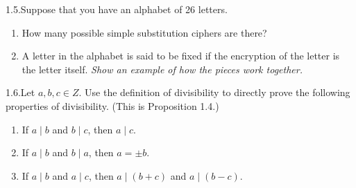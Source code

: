 \begin{exercise}
    {1.5.}Suppose that you have an alphabet of 26 letters. 
    \begin{enumerate}
        \item How many possible simple substitution ciphers are there?
        \item A letter in the alphabet is said to be fixed if the encryption of the letter is the letter itself. \textit{Show an example of how the pieces work together.}
    \end{enumerate}
\end{exercise}


\begin{exercise}
    {1.6.}Let $a, b, c \in Z$. Use the definition of divisibility to directly prove the following properties of divisibility. (This is Proposition 1.4.)
    \begin{enumerate}
        \item If $a \mid b$ and $b \mid c$, then $a \mid c$.
        \item If $a \mid b$ and $b \mid a$, then $a = \pm b$.
        \item If $a \mid b$ and $a \mid c$, then $a \mid (b + c)$ and $a \mid (b - c)$.
    \end{enumerate}
\end{exercise}

